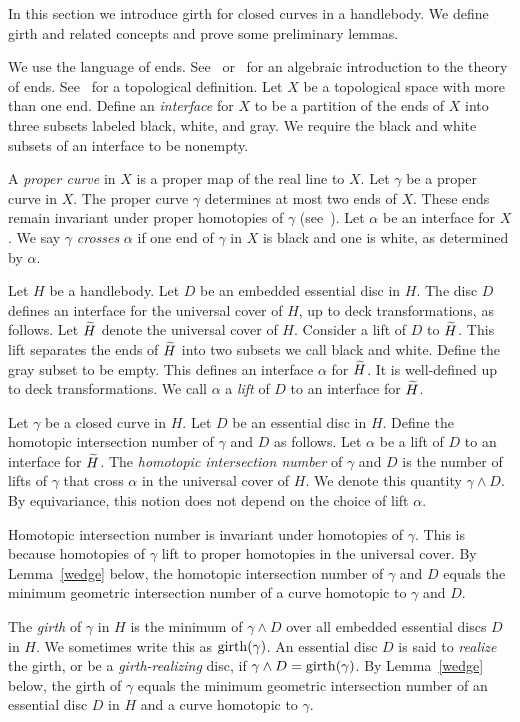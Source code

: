 In this section we introduce girth for closed curves in a handlebody.  We define girth and related concepts and prove some preliminary lemmas.

We use the language of ends.  See~\cite{E} or~\cite{St} for an algebraic introduction to the theory of ends.  See~\cite{GM} for a topological definition.  Let $X$ be a topological space with more than one end.  Define an \emph{interface} for $X$ to be a partition of the ends of $X$ into three subsets labeled black, white, and gray.  We require the black and white subsets of an interface to be nonempty.

A \emph{proper curve} in $X$ is a proper map of the real line to $X$.  Let $\gamma$ be a proper curve in $X$.  The proper curve $\gamma$ determines at most two ends of $X$.  These ends remain invariant under proper homotopies of $\gamma$ (see~\cite[p. 658]{GM}).  Let $\alpha$ be an interface for $X$.  We say $\gamma$ \emph{crosses} $\alpha$ if one end of $\gamma$ in $X$ is black and one is white, as determined by $\alpha$.

Let $H$ be a handlebody.  Let $D$ be an embedded essential disc in $H$.  The disc $D$ defines an interface for the universal cover of $H$, up to deck transformations, as follows.  Let $\widetilde{H}$ denote the universal cover of $H$.  Consider a lift of $D$ to $\widetilde{H}$.  This lift separates the ends of $\widetilde{H}$ into two subsets we call black and white.  Define the gray subset to be empty.  This defines an interface $\alpha$ for $\widetilde{H}$.  It is well-defined up to deck transformations.  We call $\alpha$ a \emph{lift} of $D$ to an interface for $\widetilde{H}$.

Let $\gamma$ be a closed curve in $H$.  Let $D$ be an essential disc in $H$.  Define the homotopic intersection number of $\gamma$ and $D$ as follows.  Let $\alpha$ be a lift of $D$ to an interface for $\widetilde{H}$.  The \emph{homotopic intersection number} of $\gamma$ and $D$ is the number of lifts of $\gamma$ that cross $\alpha$ in the universal cover of $H$.  We denote this quantity $\gamma\wedge D$.  By equivariance, this notion does not depend on the choice of lift $\alpha$.

Homotopic intersection number is invariant under homotopies of $\gamma$.  This is because homotopies of $\gamma$ lift to proper homotopies in the universal cover.  By Lemma~\ref{wedge} below, the homotopic intersection number of $\gamma$ and $D$ equals the minimum geometric intersection number of a curve homotopic to $\gamma$ and $D$.

The \emph{girth} of $\gamma$ in $H$ is the minimum of $\gamma\wedge D$ over all embedded essential discs $D$ in $H$.  We sometimes write this as $\operatorname{girth}(\gamma)$.  An essential disc $D$ is said to \emph{realize} the girth, or be a \emph{girth-realizing} disc, if $\gamma\wedge D=\operatorname{girth}(\gamma)$.  By Lemma~\ref{wedge} below, the girth of $\gamma$ equals the minimum geometric intersection number of an essential disc $D$ in $H$ and a curve homotopic to $\gamma$.

